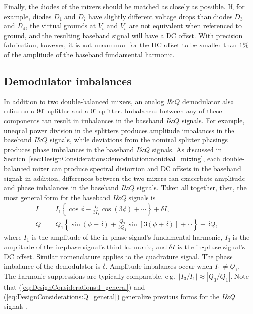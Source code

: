 Finally, the diodes of the mixers should be matched as closely as possible.
If, for example, diodes $D_1$ and $D_2$
have slightly different voltage drops than diodes $D_3$ and $D_4$,
the virtual grounds at $V_b$ and $V_d$ are not equivalent
when referenced to ground, and
the resulting baseband signal will have a DC offset.
With precision fabrication, however,
it is not uncommon for the DC offset to be smaller than $1\%$
of the amplitude of the baseband fundamental harmonic.


\subsection{Demodulator imbalances}
\label{sec:DesignConsiderations:demodulation:demodulator_imbalances}
In addition to two double-balanced mixers,
an analog $I\&Q$ demodulator also relies on
a $90^{\circ}$ splitter and a $0^{\circ}$ splitter.
Imbalances between any of these components
can result in imbalances in the baseband $I\&Q$ signals.
For example, unequal power division in the splitters
produces amplitude imbalances in the baseband $I\&Q$ signals, while
deviations from the nominal splitter phasings
produces phase imbalances in the baseband $I\&Q$ signals.
As discussed in
Section~\ref{sec:DesignConsiderations:demodulation:nonideal_mixing},
each double-balanced mixer can produce
spectral distortion and DC offsets in the baseband signal;
in addition, differences between the two mixers
can exacerbate amplitude and phase imbalances
in the baseband $I\&Q$ signals.
Taken all together, then,
the most general form for the baseband $I\&Q$ signals is
\begin{align}
  I
  &=
  I_1 \left\{%
    \cos\phi
    -
    \frac{I_3}{3 I_1}
    \cos \left( 3 \phi \right)
    +
    \cdots
  \right\}
  +
  \delta I,
  \label{eq:DesignConsiderations:I_general}
  \\
  Q
  &=
  Q_1 \left\{%
    \sin \left( \phi + \delta \right)
    +
    \frac{Q_3}{3 Q_1}
    \sin \left[ 3 \left( \phi + \delta \right) \right]
    +
    \cdots
  \right\}
  +
  \delta Q,
  \label{eq:DesignConsiderations:Q_general}
\end{align}
where
$I_1$ is the amplitude of the in-phase signal's fundamental harmonic,
$I_3$ is the amplitude of the in-phase signal's third harmonic, and
$\delta I$ is the in-phase signal's DC offset.
Similar nomenclature applies to the quadrature signal.
The phase imbalance of the demodulator is $\delta$.
Amplitude imbalances occur when $I_1 \neq Q_1$.
The harmonic suppressions are typically comparable,
e.g.\ $|I_3 / I_1| \approx |Q_3 / Q_1|$.
Note that (\ref{eq:DesignConsiderations:I_general}) and
(\ref{eq:DesignConsiderations:Q_general})
generalize previous forms for the $I\&Q$ signals
\cite{vanzeeland_rsi04}.


